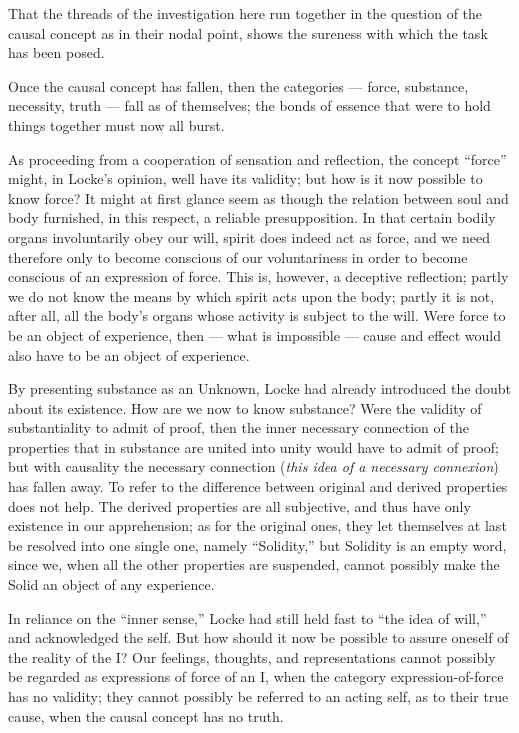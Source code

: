 \documentclass[12pt]{book}
\begin{document}
That the threads of the investigation here run together in the question of the
causal concept as in their nodal point, shows the sureness with which the task has
been posed.

Once the causal concept has fallen, then the categories --- force, substance,
necessity, truth --- fall as of themselves; the bonds of essence that were to hold
things together must now all burst.

As proceeding from a cooperation of sensation and reflection, the concept
``force'' might, in Locke's opinion, well have its validity; but how is it now
possible to know force? It might at first glance seem as though the relation
between soul and body furnished, in this respect, a reliable presupposition. In
that certain bodily organs involuntarily obey our will, spirit does indeed act as
force, and we need therefore only to become conscious of our voluntariness in
order to become conscious of an expression of force. This is, however, a
deceptive reflection; partly we do not know the means by which spirit acts upon
the body; partly it is not, after all, all the body's organs whose activity is
subject to the will. Were force to be an object of experience, then --- what is
impossible --- cause and effect would also have to be an object of experience.

By presenting substance as an Unknown, Locke had already introduced the doubt
about its existence. How are we now to know substance? Were the validity of
substantiality to admit of proof, then the inner necessary connection of the
properties that in substance are united into unity would have to admit of proof;
but with causality the necessary connection (\textit{this idea of a necessary
connexion}) has fallen away. To refer to the difference between original and
derived properties does not help. The derived properties are all subjective, and
thus have only
existence in our apprehension; as for the original ones, they let themselves at
last be resolved into one single one, namely ``Solidity,'' but Solidity is an
empty word, since we, when all the other properties are suspended, cannot possibly
make the Solid an object of any experience.

In reliance on the ``inner sense,'' Locke had still held fast to ``the idea of
will,'' and acknowledged the self. But how should it now be possible to assure
oneself of the reality of the I? Our feelings, thoughts, and representations
cannot possibly be regarded as expressions of force of an I, when the category
expression-of-force has no validity; they cannot possibly be referred to an acting
self, as to their true cause, when the causal concept has no truth.
\end{document}
